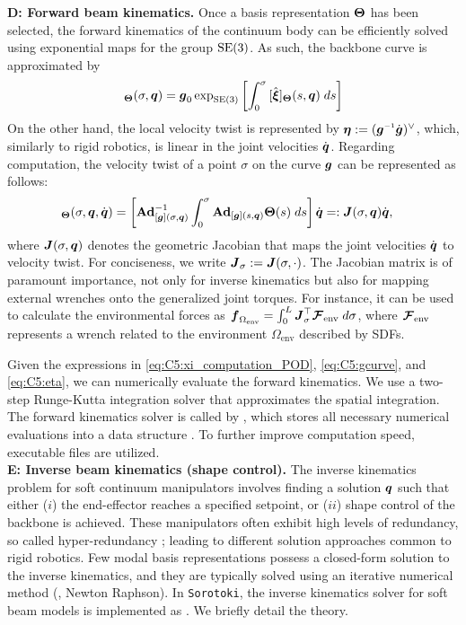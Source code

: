 \textbf{D: Forward beam kinematics.} Once a basis representation ${\boldsymbol{\Theta}}$ has been selected, the forward kinematics of the continuum body can be efficiently solved using exponential maps for the group $\textup{\textrm{SE}}(3)$. As such, the backbone curve is approximated by
%
\begin{equation}
    [\gB]_{\ThetaB}(\sigma,\q) = \gB_0 \exp_{\textrm{SE}(3)} \left[ \int_0^\sigma {[\hat{\xiB}]_\ThetaB}(s,\q) \; ds\right]
    \label{eq:C5:gcurve}
\end{equation}
%
On the other hand, the local velocity twist is represented by $\etaB:= (\gB\inv\dot{\gB})^{\vee}$, which, similarly to rigid robotics, is linear in the joint velocities $\dot{{\boldsymbol{q}}}$. Regarding computation, the velocity twist of a point $\sigma$ on the curve ${\boldsymbol{g}}$ can be represented as follows:
%
\begin{align}
    [\etaB]_\ThetaB(\sigma,\q,\dq) & = \left[\Ad^{-1}_{[\gB](\sigma,\q)}\int_{0}^\sigma  \Ad_{[\gB](s,\q)} \ThetaB(s)\; ds \right]  \dq  %
                                   =: \JB(\sigma,\q) \dq,
                                  \label{eq:C5:eta}                                  
\end{align}
%
where ${\boldsymbol{J}}(\sigma,{\boldsymbol{q}})$ denotes the geometric Jacobian that maps the joint velocities ${\dot{\boldsymbol{q}}}$ to velocity twist. For conciseness, we write ${\boldsymbol{J}}_\sigma := {\boldsymbol{J}}(\sigma,\cdot)$. The Jacobian matrix is of paramount importance, not only for inverse kinematics but also for mapping external wrenches onto the generalized joint torques. For instance, it can be used to calculate the environmental forces as ${\boldsymbol{f}}_{\Omega_{\textrm{env}}} = \int_0^L {\boldsymbol{J}}_\sigma^\top {\boldsymbol{\mathcal{F}}}_{\textrm{env}} \; d\sigma$, where ${\boldsymbol{\mathcal{F}}}_{\textrm{env}}$ represents a wrench related to the environment $\Omega_{\textrm{env}}$ described by SDFs. 

Given the expressions in \eqref{eq:C5:xi_computation_POD}, \eqref{eq:C5:gcurve}, and \eqref{eq:C5:eta}, we can numerically evaluate the forward kinematics. We use a two-step Runge-Kutta integration solver that approximates the spatial integration. The forward kinematics solver is called by , which stores all necessary numerical evaluations into a data structure . To further improve computation speed,  executable files are utilized. \\[0.5em]

\textbf{E: Inverse beam kinematics (shape control).} \label{sec:C5:inverseKinematics} The inverse kinematics problem for soft continuum manipulators involves finding a solution ${\boldsymbol{q}}$ such that either ($i$) the end-effector reaches a specified setpoint, or ($ii$) shape control of the backbone is achieved. These manipulators often exhibit high levels of redundancy, so called hyper-redundancy \cite{Chirikjian1994Jun}; leading to different solution approaches common to rigid robotics. Few modal basis representations possess a closed-form solution to the inverse kinematics, and they are typically solved using an iterative numerical method (\eg, Newton Raphson). In \texttt{Sorotoki}, the inverse kinematics solver for soft beam models is implemented as . We briefly detail the theory.

